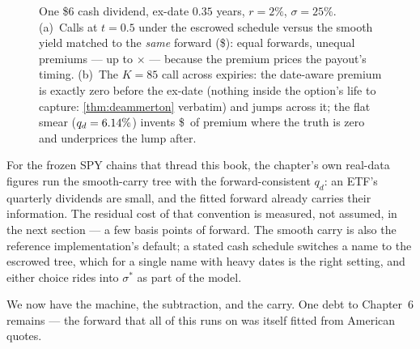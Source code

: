 \begin{figure}[htbp]
\centering
{}
\caption{One \$6 cash dividend, ex-date $0.35$ years, $r=2\%$,
$\sigma=25\%$.  (a)~Calls at $t=0.5$ under the escrowed schedule
versus the smooth yield matched to the \emph{same} forward
(\$\MacDeamEscrowFwd): equal forwards, unequal premiums --- up to
\MacDeamEscrowRatioMax$\times$ --- because the premium prices the
payout's timing.  (b)~The $K=85$ call across expiries: the date-aware
premium is exactly zero before the ex-date (nothing inside the
option's life to capture: \cref{thm:deammerton} verbatim) and jumps
across it; the flat smear ($q_d=6.14\%$) invents
\$\MacDeamEscrowFlatPreExMax\ of premium where the truth is zero and
underprices the lump after.}
\label{fig:deamescrow}
\end{figure}

For the frozen SPY chains that thread this book, the chapter's own
real-data figures run the smooth-carry tree with the
forward-consistent $q_d$: an ETF's quarterly dividends are small, and
the fitted forward already carries their information.  The residual
cost of that convention is measured, not assumed, in the next section
--- a few basis points of forward.  The smooth carry is also the
reference implementation's default; a stated cash schedule switches
a name to the escrowed tree, which for a single name with heavy dates
is the right setting, and either choice
rides into $\sigma^*$ as part of the model.

We now have the machine, the subtraction, and the carry.  One debt to
Chapter~6 remains --- the forward that all of this runs on was itself
fitted from American quotes.
